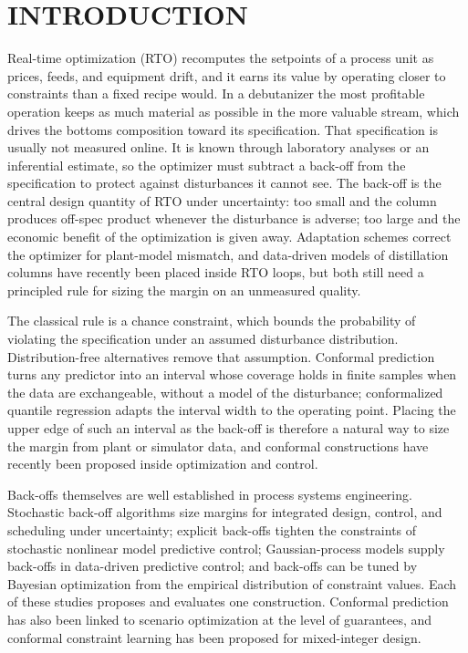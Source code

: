 \documentclass[12pt]{article}
\begin{document}
\section{INTRODUCTION}

Real-time optimization (RTO) recomputes the setpoints of a process unit as prices, feeds, and
equipment drift, and it earns its value by operating closer to constraints than a fixed recipe
would. In a debutanizer the most profitable operation keeps as much material as possible in the
more valuable stream, which drives the bottoms composition toward its specification. That
specification is usually not measured online. It is known through laboratory analyses or an
inferential estimate, so the optimizer must subtract a back-off from the specification to protect
against disturbances it cannot see. The back-off is the central design quantity of RTO under
uncertainty: too small and the column produces off-spec product whenever the disturbance is
adverse; too large and the economic benefit of the optimization is given away. Adaptation schemes
correct the optimizer for plant-model mismatch,\citep{marchetti2009,chachuat2009} and
data-driven models of distillation columns have recently been placed inside RTO loops,\citep{rodriguez2025cjce} but both still need a principled rule for sizing the margin on an
unmeasured quality.

The classical rule is a chance constraint, which bounds the probability of violating the
specification under an assumed disturbance distribution.\citep{li2008} Distribution-free
alternatives remove that assumption. Conformal prediction turns any predictor into an interval
whose coverage holds in finite samples when the data are exchangeable, without a model of the
disturbance\citep{vovk2005,lei2018,angelopoulos2023}; conformalized quantile regression adapts the
interval width to the operating point.\citep{romano2019} Placing the upper edge of such an
interval as the back-off is therefore a natural way to size the margin from plant or simulator
data, and conformal constructions have recently been proposed inside optimization and control.\citep{zhao2024cpp,zhang2024}

Back-offs themselves are well established in process systems engineering. Stochastic back-off
algorithms size margins for integrated design, control, and scheduling under uncertainty\citep{rafiei2018,koller2018}; explicit back-offs tighten the constraints of stochastic nonlinear
model predictive control\citep{paulson2018,mesbah2016}; Gaussian-process models supply back-offs
in data-driven predictive control\citep{bradford2020}; and back-offs can be tuned by Bayesian
optimization from the empirical distribution of constraint values.\citep{petsagkourakis2022} Each
of these studies proposes and evaluates one construction. Conformal prediction has also been
linked to scenario optimization at the level of guarantees,\citep{osullivan2025,campi2009} and
conformal constraint learning has been proposed for mixed-integer design.\citep{ovalle2025}
\end{document}
